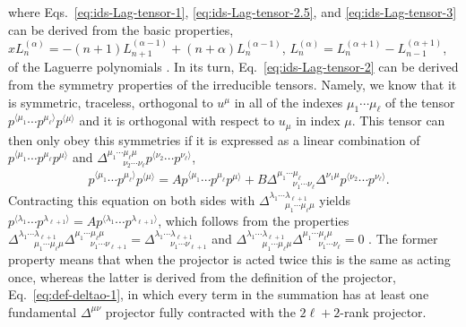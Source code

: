 \documentclass[aps,prd,preprint,nofootinbib,amsmath,amssymb,showpacs,longbibliography,singlecolumn,superscriptaddress,10pt]{revtex4-1}
\theoremstyle{plain}
\theoremstyle{definition}
\begin{document}
%
where Eqs.~\eqref{eq:ids-Lag-tensor-1},
\eqref{eq:ids-Lag-tensor-2.5},
and \eqref{eq:ids-Lag-tensor-3} can be derived from the basic properties,  $x L_{n}^{(\alpha)} = -(n+1) L_{n+1}^{(\alpha-1)} + (n + \alpha) L_{n}^{(\alpha-1)}$, $L_{n}^{(\alpha)} = L_{n}^{(\alpha + 1)} - L_{n-1}^{(\alpha+1)}$, of the Laguerre polynomials \cite{NIST:DLMF,gradshteyn2014table}. In its turn, Eq.~\eqref{eq:ids-Lag-tensor-2} can be derived from the symmetry properties of the irreducible tensors. Namely, we know that it is symmetric, traceless, orthogonal to $u^{\mu}$ in all of the indexes $\mu_{1} \cdots \mu_{\ell}$ of the tensor $p^{\langle \mu_{1}} \cdots p^{ \mu_{\ell} \rangle} p^{\langle \mu \rangle}$ and it is orthogonal with respect to $u_{\mu}$ in index $\mu$. This tensor can then only obey this symmetries if it is expressed as a linear combination of $p^{\langle \mu_{1}} \cdots p^{ \mu_{\ell} } p^{\mu \rangle}$ and $\Delta^{\mu_{1} \cdots \mu_{\ell} \mu}_{ \ \ \ \ \ \ \ \ \nu_{2} \cdots \nu_{\ell}} 
p^{\langle \nu_{2}} \cdots p^{ \nu_{\ell} \rangle}$, 
%
\begin{equation}
\begin{aligned}
&
p^{\langle \mu_{1}} \cdots p^{ \mu_{\ell} \rangle} 
 p^{\langle \mu \rangle} 
 =
A p^{\langle \mu_{1}} \cdots p^{ \mu_{\ell} } 
 p^{\mu \rangle} 
 +
B 
\Delta^{\mu_{1} \cdots \mu_{\ell}}_{ \ \ \ \ \ \ \ \ \nu_{1} \cdots \nu_{\ell}} \Delta^{\nu_{1} \mu} 
p^{\langle \nu_{2}} \cdots p^{ \nu_{\ell} \rangle} .
\end{aligned}    
\end{equation}
%
Contracting this equation on both sides with $\Delta^{\lambda_{1} \cdots \lambda_{\ell + 1}}_{ \ \ \ \ \ \ \ \ \mu_{1} \cdots \mu_{\ell} \mu}$
yields $p^{\langle \lambda_{1}} \cdots p^{ \lambda_{\ell + 1} \rangle} 
 =
A p^{\langle \lambda_{1}} \cdots p^{ \lambda_{\ell + 1} \rangle} $, which follows from the properties $\Delta^{\lambda_{1} \cdots \lambda_{\ell + 1}}_{ \ \ \ \ \ \ \ \ \mu_{1} \cdots \mu_{\ell} \mu} \Delta^{\mu_{1} \cdots \mu_{\ell} \mu}_{ \ \ \ \ \ \ \ \ \nu_{1} \cdots \nu_{\ell + 1}} =
\Delta^{\lambda_{1} \cdots \lambda_{\ell + 1}}_{ \ \ \ \ \ \ \ \ \nu_{1} \cdots \nu_{\ell + 1}}$ and $\Delta^{\lambda_{1} \cdots \lambda_{\ell + 1}}_{ \ \ \ \ \ \ \ \ \mu_{1} \cdots \mu_{\ell} \mu} \Delta^{\mu_{1} \cdots \mu_{\ell} \mu}_{ \ \ \ \ \ \ \ \ \nu_{1} \cdots \nu_{\ell}} = 0$ \cite{deBrito:2024vhm}. The former property means that when the projector is acted twice this is the same as acting once, whereas the latter is derived from the definition of the projector, Eq.~\eqref{eq:def-deltao-1}, in which every term in the summation has at least one fundamental $\Delta^{\mu \nu}$ projector fully contracted with the $2 \ell + 2$-rank projector. 
\end{document}
